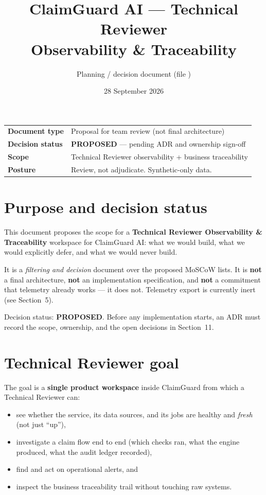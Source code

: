 \documentclass[11pt]{article}
\title{\vspace{-1.6em}\textbf{ClaimGuard AI --- Technical Reviewer\\[0.25em]
Observability \& Traceability}\vspace{0.4em}}
\author{Planning / decision document (file \code{obs\_trace.tex})}
\date{28 September 2026}
\begin{document}
\maketitle

\begin{center}
\begin{tabular}{@{}ll@{}}
\toprule
\textbf{Document type} & Proposal for team review (not final architecture) \\
\textbf{Decision status} & \textbf{PROPOSED} --- pending ADR and ownership sign-off \\
\textbf{Scope} & Technical Reviewer observability + business traceability \\
\textbf{Posture} & Review, not adjudicate. Synthetic-only data. \\
\bottomrule
\end{tabular}
\end{center}

\section{Purpose and decision status}

This document proposes the scope for a \textbf{Technical Reviewer
Observability \& Traceability} workspace for ClaimGuard AI: what we would
build, what we would explicitly defer, and what we would never build.

It is a \emph{filtering and decision} document over the proposed MoSCoW lists.
It is \textbf{not} a final architecture, \textbf{not} an implementation
specification, and \textbf{not} a commitment that telemetry already works ---
it does not. Telemetry export is currently inert (see Section~5).

Decision status: \textbf{PROPOSED}. Before any implementation starts, an ADR
must record the scope, ownership, and the open decisions in Section~11.

\section{Technical Reviewer goal}

The goal is a \textbf{single product workspace} inside ClaimGuard from which a
Technical Reviewer can:

\begin{itemize}
\item see whether the service, its data sources, and its jobs are healthy and
      \emph{fresh} (not just ``up''),
\item investigate a claim flow end to end (which checks ran, what the engine
      produced, what the audit ledger recorded),
\item find and act on operational alerts, and
\item inspect the business traceability trail without touching raw systems.
\end{itemize}
\end{document}
